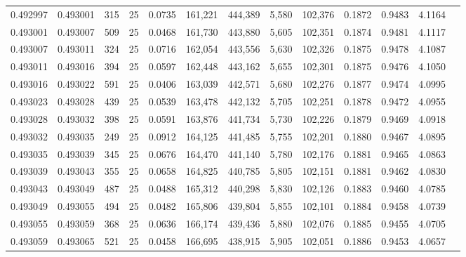 \begin{tabular}{rrrrrrrrrrrrr}
0.492997 & 0.493001 &   315 &  25 &                                     0.0735 & 161,221 & 444,389 &   5,580 & 102,376 & 0.1872 & 0.9483 & 4.1164 \\
0.493001 & 0.493007 &   509 &  25 &                                     0.0468 & 161,730 & 443,880 &   5,605 & 102,351 & 0.1874 & 0.9481 & 4.1117 \\
0.493007 & 0.493011 &   324 &  25 &                                     0.0716 & 162,054 & 443,556 &   5,630 & 102,326 & 0.1875 & 0.9478 & 4.1087 \\
0.493011 & 0.493016 &   394 &  25 &                                     0.0597 & 162,448 & 443,162 &   5,655 & 102,301 & 0.1875 & 0.9476 & 4.1050 \\
0.493016 & 0.493022 &   591 &  25 &                                     0.0406 & 163,039 & 442,571 &   5,680 & 102,276 & 0.1877 & 0.9474 & 4.0995 \\
0.493023 & 0.493028 &   439 &  25 &                                     0.0539 & 163,478 & 442,132 &   5,705 & 102,251 & 0.1878 & 0.9472 & 4.0955 \\
0.493028 & 0.493032 &   398 &  25 &                                     0.0591 & 163,876 & 441,734 &   5,730 & 102,226 & 0.1879 & 0.9469 & 4.0918 \\
0.493032 & 0.493035 &   249 &  25 &                                     0.0912 & 164,125 & 441,485 &   5,755 & 102,201 & 0.1880 & 0.9467 & 4.0895 \\
0.493035 & 0.493039 &   345 &  25 &                                     0.0676 & 164,470 & 441,140 &   5,780 & 102,176 & 0.1881 & 0.9465 & 4.0863 \\
0.493039 & 0.493043 &   355 &  25 &                                     0.0658 & 164,825 & 440,785 &   5,805 & 102,151 & 0.1881 & 0.9462 & 4.0830 \\
0.493043 & 0.493049 &   487 &  25 &                                     0.0488 & 165,312 & 440,298 &   5,830 & 102,126 & 0.1883 & 0.9460 & 4.0785 \\
0.493049 & 0.493055 &   494 &  25 &                                     0.0482 & 165,806 & 439,804 &   5,855 & 102,101 & 0.1884 & 0.9458 & 4.0739 \\
0.493055 & 0.493059 &   368 &  25 &                                     0.0636 & 166,174 & 439,436 &   5,880 & 102,076 & 0.1885 & 0.9455 & 4.0705 \\
0.493059 & 0.493065 &   521 &  25 &                                     0.0458 & 166,695 & 438,915 &   5,905 & 102,051 & 0.1886 & 0.9453 & 4.0657 \\

\end{tabular}
